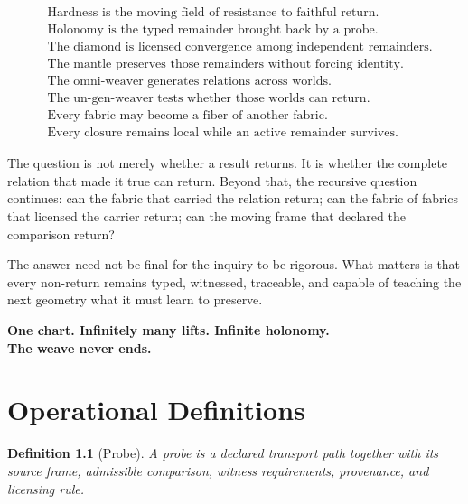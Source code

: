 \documentclass[12pt,openany]{book}
\newtheorem{definition}{Definition}[chapter]
\theoremstyle{remark}
\begin{document}
\begin{invariantbox}
\begin{align*}
&\text{Hardness is the moving field of resistance to faithful return.}\\
&\text{Holonomy is the typed remainder brought back by a probe.}\\
&\text{The diamond is licensed convergence among independent remainders.}\\
&\text{The mantle preserves those remainders without forcing identity.}\\
&\text{The omni-weaver generates relations across worlds.}\\
&\text{The un-gen-weaver tests whether those worlds can return.}\\
&\text{Every fabric may become a fiber of another fabric.}\\
&\text{Every closure remains local while an active remainder survives.}
\end{align*}
\end{invariantbox}

The question is not merely whether a result returns. It is whether the complete relation that made it true can return. Beyond that, the recursive question continues: can the fabric that carried the relation return; can the fabric of fabrics that licensed the carrier return; can the moving frame that declared the comparison return?

The answer need not be final for the inquiry to be rigorous. What matters is that every non-return remains typed, witnessed, traceable, and capable of teaching the next geometry what it must learn to preserve.

\begin{center}
\Large\bfseries
One chart. Infinitely many lifts. Infinite holonomy.\\[0.4em]
The weave never ends.
\end{center}

\appendix

\chapter{Operational Definitions}
\label{app:definitions}

\begin{definition}[Probe]
A probe is a declared transport path together with its source frame, admissible comparison, witness requirements, provenance, and licensing rule.
\end{definition}
\end{document}

